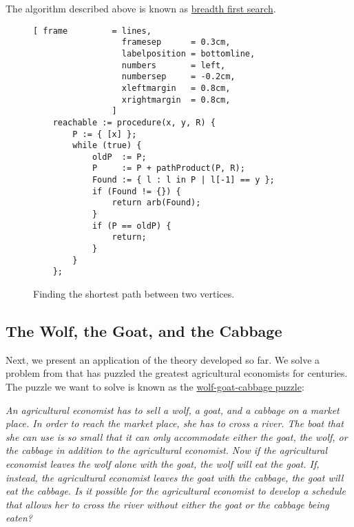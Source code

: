 \remarkEng
The algorithm described above is known as 
\href{https://en.wikipedia.org/wiki/Breadth-first_search}{breadth first search}. \eox 



\begin{figure}[!ht]
  \centering
\begin{Verbatim}[ frame         = lines, 
                  framesep      = 0.3cm, 
                  labelposition = bottomline,
                  numbers       = left,
                  numbersep     = -0.2cm,
                  xleftmargin   = 0.8cm,
                  xrightmargin  = 0.8cm,
                ]
    reachable := procedure(x, y, R) {
        P := { [x] };
        while (true) {
            oldP  := P;
            P     := P + pathProduct(P, R);
            Found := { l : l in P | l[-1] == y };
            if (Found != {}) {
                return arb(Found);
            }
            if (P == oldP) {
                return;
            }
        }
    };
\end{Verbatim} 
\vspace*{-0.3cm}
\caption{Finding the shortest path between two vertices.}  
\label{fig:find-path.stlx}
\end{figure}

\subsection{The Wolf, the Goat, and the Cabbage}
Next, we present an application of the theory developed so far.  We solve a problem from that has puzzled
the greatest agricultural economists for centuries.  The puzzle we want to solve is known as the 
\href{http://jeux.lulu.pagesperso-orange.fr/html/anglais/loupChe/loupChe1.htm}{wolf-goat-cabbage puzzle}:  
\vspace*{0.3cm}

\begin{minipage}[c]{14cm}
{\sl
An agricultural economist has to sell a wolf, a goat, and a cabbage on a market place.  In order to
reach the market place, she has to cross a river.  The boat that she can use is so small that it can
only accommodate either the goat, the wolf, or the cabbage in addition to the agricultural economist.
Now if the agricultural economist leaves the wolf alone with the goat, the wolf will eat the goat.
If, instead, the agricultural economist leaves the goat with the cabbage, the goat will eat the cabbage.
Is it possible for the agricultural economist to develop a schedule that allows her to cross the river
without either the goat or the cabbage being eaten?
}
\end{minipage}
\vspace*{0.3cm}

